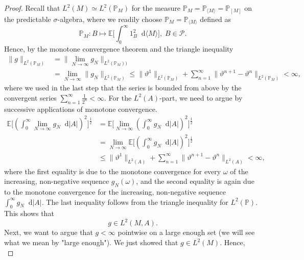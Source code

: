 \documentclass[11pt,a4paper,twoside,openany]{report}
\numberwithin{equation}{section}
\newcommand{\diff}{\mathop{}\!\mathrm{d}}
\theoremstyle{plain} %
\theoremstyle{definition} %
\theoremstyle{remark} %
\begin{document}
\begin{proof}
    
    Recall that \(L^2(M)\simeq L^2(\mathbb{P}_M)\) for the measure \(\mathbb{P}_M=\mathbb{P}_{\langle M\rangle}=\mathbb{P}_{[M]}\) on the predictable \(\sigma\)-algebra, where we readily choose \(\mathbb{P}_M=\mathbb{P}_{\langle M\rangle}\) defined as
    \begin{equation*}
    \mathbb{P}_M:B\mapsto\mathbb{E}\bigg[\int_0^{\infty}1_B^2\diff\langle M\rangle\bigg],\;B\in\mathcal{P}.
    \end{equation*}
    Hence, by the monotone convergence theorem and the triangle inequality
    \begin{align*}
        \lVert g\rVert_{L^2(\mathbb{P}_M)}&=\lVert \lim_{N\to\infty}g_N\rVert_{L^2(\mathbb{P}_M))}
        \\&=\lim_{N\to\infty}\lVert g_N\rVert_{L^2(\mathbb{P}_M)}\leq \lVert
        \vartheta^1\rVert_{L^2(\mathbb{P}_M)}+\sum_{n=1}^\infty\lVert \vartheta^{n+1}-\vartheta^n\rVert_{L^2(\mathbb{P}_M)}<\infty,
    \end{align*}
    where we used in the last step that the series is bounded from above by the convergent series \(\sum_{n=1}^\infty\frac{1}{2^n}<\infty\). For the \(L^2(A)\)-part, we need to argue by successive applications of monotone convergence.
    \begin{align*}
    \mathbb{E}\bigg[\left(\int_0^{\infty}\lim_{N\to\infty}g_N\diff|A|\right)^2\bigg]^{\frac{1}{2}}&=\mathbb{E}\bigg[\lim_{N\to\infty}\left(\int_0^{\infty} g_N\diff|A|\right)^2\bigg]^{\frac{1}{2}}
    \\&=\lim_{N\to\infty}\mathbb{E}\bigg[\left(\int_0^{\infty} g_N\diff|A|\right)^2\bigg]^{\frac{1}{2}}
    \\&\leq \lVert\vartheta^1\rVert_{L^2(A)}+\sum_{n=1}^{\infty}\lVert \vartheta^{n+1}-\vartheta^{n}\rVert_{L^2(A)}<\infty,
    \end{align*}
    where the first equality is due to the monotone convergence for every \(\omega\) of the increasing, non-negative sequence \(g_N(\omega)\), and the second equality is again due to the monotone convergence for the increasing, non-negative sequence \(\int_0^{\infty}g_N\diff |A|\). The last inequality follows from the triangle inequality for \(L^2(\mathbb{P})\). This shows that
    \begin{equation*}
        g\in L^2(M,A).
    \end{equation*}
    Next, we want to argue that \(g<\infty\) pointwise on a large enough set (we will see what we mean by "large enough"). We just showed that \(g\in L^2(M)\). Hence, 
    \begin{equation}\label{eq:g is P_M finite}

\end{equation}
\end{proof}
\end{document}

